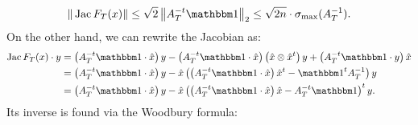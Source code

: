 \documentclass[a4paper]{article}
\begin{document}
        \begin{align*}
            \| \Jacobian F_T(x) \| 
            \leq 
            \sqrt 2 \left\| A_{T}^{-t} \vecone \right\|_{2}
            \leq 
            \sqrt{2n} \cdot \sigma_{\max}(A_{T}^{-1}) 
            .
        \end{align*}
        On the other hand, we can rewrite the Jacobian as:
        \begin{align*}
            \Jacobian F_T(x) \cdot y
            &= 
            \left( A_{T}^{-t} \vecone \cdot \hat x \right)
            y
            - 
            \left( A_{T}^{-t} \vecone \cdot \hat x \right)
            \left( \hat x \otimes \hat x^t \right) y
            + 
            \left( A_{T}^{-t} \vecone \cdot y \right) \hat x 
            \\&= 
            \left( A_{T}^{-t} \vecone \cdot \hat x \right)
            y
            - 
            \hat x 
            \left( 
                \left( A_{T}^{-t} \vecone \cdot \hat x \right) \hat x^{t}
                -
                \vecone^{t} A_{T}^{-1} 
            \right) y
            \\&= 
            \left( A_{T}^{-t} \vecone \cdot \hat x \right)
            y
            - 
            \hat x 
            \left( 
                \left( A_{T}^{-t} \vecone \cdot \hat x \right) \hat x
                -
                A_{T}^{-t} \vecone
            \right)^{t} y
            .
        \end{align*}
        Its inverse is found via the Woodbury formula: 
\end{document}
